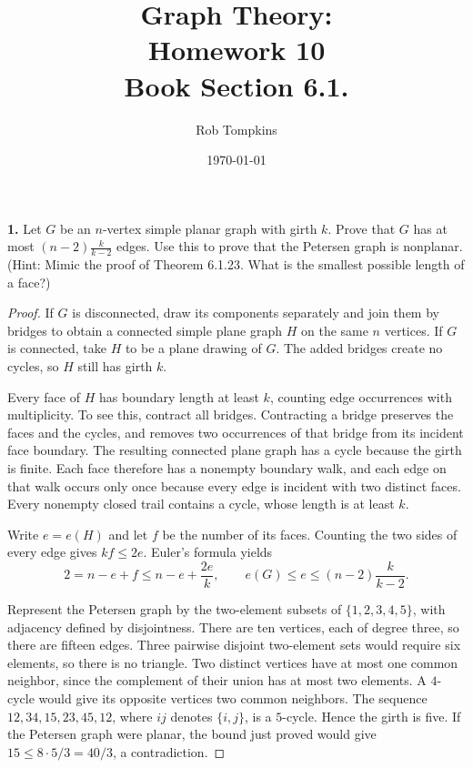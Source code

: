 \documentclass[12pt]{amsart}
\title{Graph Theory:\\Homework 10\\ Book Section 6.1.}
\author{Rob Tompkins}
\date{\today}
\theoremstyle{conjecture}
\theoremstyle{definition}
\theoremstyle{question}
\theoremstyle{theorem}
\begin{document}
    \maketitle

    \noindent\textbf{1.} Let $G$ be an $n$-vertex simple planar graph with girth $k$.
    Prove that $G$ has at most $(n-2)\frac{k}{k-2}$ edges.
    Use this to prove that the Petersen graph is nonplanar.
    (Hint: Mimic the proof of Theorem 6.1.23.
    What is the smallest possible length of a face?)

    \begin{proof}
        If $G$ is disconnected, draw its components separately and join them
        by bridges to obtain a connected simple plane graph $H$ on the same
        $n$ vertices. If $G$ is connected, take $H$ to be a plane drawing of
        $G$. The added bridges create no cycles, so $H$ still has girth $k$.

        Every face of $H$ has boundary length at least $k$, counting edge
        occurrences with multiplicity. To see this, contract all bridges.
        Contracting a bridge preserves the faces and the cycles, and removes
        two occurrences of that bridge from its incident face boundary.
        The resulting connected plane graph has a cycle because the girth
        is finite. Each face therefore has a nonempty boundary walk, and
        each edge on that walk occurs only once because every edge is
        incident with two distinct faces. Every nonempty closed trail
        contains a cycle, whose length is at least $k$.

        Write $e=e(H)$ and let $f$ be the number of its faces. Counting the
        two sides of every edge gives $kf\le 2e$. Euler's formula yields
        \[
            2=n-e+f\le n-e+\frac{2e}{k},
            \qquad
            e(G)\le e\le (n-2)\frac{k}{k-2}.
        \]

        Represent the Petersen graph by the two-element subsets of
        $\{1,2,3,4,5\}$, with adjacency defined by disjointness. There are
        ten vertices, each of degree three, so there are fifteen edges.
        Three pairwise disjoint two-element sets would require six
        elements, so there is no triangle. Two distinct vertices have
        at most one common neighbor, since the complement of their union
        has at most two elements. A $4$-cycle would give its opposite
        vertices two common neighbors. The sequence
        $12,34,15,23,45,12$, where $ij$ denotes $\{i,j\}$, is a $5$-cycle.
        Hence the girth is five. If the Petersen graph were planar, the
        bound just proved would give $15\le 8\cdot 5/3=40/3$, a contradiction.
    \end{proof}
\end{document}
